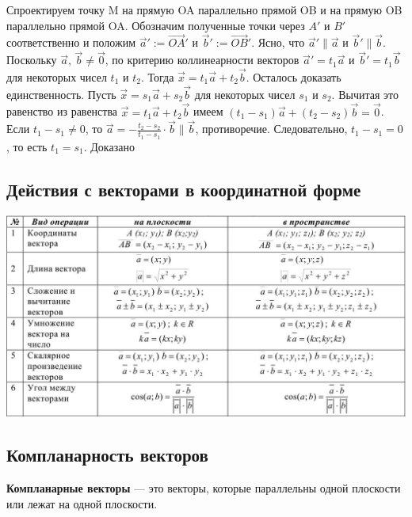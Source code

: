 \documentclass[a4paper]{article}
\begin{document}
    Спроектируем точку M на прямую OA параллельно прямой OB и на прямую OB параллельно прямой OA. Обозначим полученные точки через $A'$ и $B'$ соответственно и положим  $\vec{a}' := \overrightarrow{OA}'$ и $\vec{b}' := \overrightarrow{OB}'$. Ясно, что $\vec{a}' \parallel \vec{a}$ и $\vec{b}' \parallel \vec{b}$. Поскольку $\vec{a}$, $\vec{b} \neq \vec{0}$, по критерию коллинеарности векторов $\vec{a}' = t_1 \vec{a}$ и $\vec{b}' = t_1 \vec{b}$ для некоторых чисел $t_1$ и $t_2$.
    Тогда $\vec{x} = t_1 \vec{a} + t_2 \vec{b}$.
    Осталось доказать единственность. Пусть $\vec{x} = s_1 \vec{a} + s_2 \vec{b}$ для некоторых чисел $s_1$ и $s_2$.
    Вычитая это равенство из равенства $\vec{x} = t_1 \vec{a} + t_2 \vec{b}$
    имеем $(t_1 - s_1) \vec{a} + (t_2 - s_2) \vec{b} = \vec{0}$.
    Если $t_1-s_1 \neq 0$, то $\displaystyle \vec{a} = - \frac{t_2 - s_2}{t_1 - s_1} \cdot \vec{b} \parallel \vec{b}$, противоречие.
    Следовательно, $t_1 - s_1 = 0$, то есть $t_1 = s_1$. Доказано


    \subsection*{Действия с векторами в координатной форме}

    \includegraphics[width=18cm]{t2}

    \newpage \begin{center}
                 \begin{Large}
                 \end{Large}
    \end{center}
    \subsection*{Компланарность векторов}
    \textbf{Компланарные векторы} — это векторы, которые параллельны одной плоскости или лежат на одной плоскости.
\end{document}
